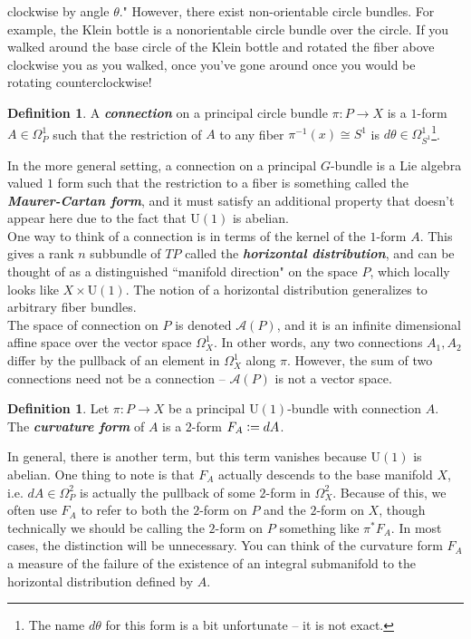 \documentclass[psamsfonts, 12pt]{amsart}
\theoremstyle{definition}
\newtheorem{defn}[thm]{Definition}
\theoremstyle{remark}
\newcommand{\ib}[1]{\textbf{\textit{#1}}}
\newcommand{\inv}{^{-1}}
\newcommand{\defeq}{\vcentcolon=}
\begin{document}
clockwise by angle $\theta$." However, there exist non-orientable circle bundles. For
example, the Klein bottle is a nonorientable circle bundle over the circle. If you
walked around the base circle of the Klein bottle and rotated the fiber above clockwise
you as you walked, once you've gone around once you would be rotating counterclockwise!
%
\begin{defn}
A \ib{connection} on a principal circle bundle $\pi : P \to X$ is a $1$-form
$A \in \Omega^1_P$ such that the restriction of $A$ to any fiber $\pi\inv(x) \cong S^1$
is $d\theta \in \Omega^1_{S^1}$\footnote{The name $d\theta$ for this form is a bit
unfortunate -- it is not exact.}.
\end{defn}
%
In the more general setting, a connection on a principal $G$-bundle is a Lie
algebra valued $1$ form such that the restriction to a fiber is something called
the \ib{Maurer-Cartan form}, and it must satisfy an additional property that doesn't
appear here due to the fact that $\mathrm{U}(1)$ is abelian. \\

One way to think of a connection is in terms of the kernel of the $1$-form $A$.
This gives a rank $n$ subbundle of $TP$ called the \ib{horizontal distribution},
and can be thought of as a distinguished ``manifold direction" on the space $P$,
which locally looks like $X \times \mathrm{U}(1)$. The notion of a horizontal
distribution generalizes to arbitrary fiber bundles. \\

The space of connection on $P$ is denoted $\mathscr{A}(P)$, and it is an
infinite dimensional affine space over the vector space $\Omega^1_X$. In
other words, any two connections $A_1,A_2$ differ by the pullback of an element
in $\Omega^1_X$ along $\pi$. However, the sum of two connections need not
be a connection -- $\mathscr{A}(P)$ is not a vector space.
%
\begin{defn}
Let $\pi : P \to X$ be a principal $\mathrm{U}(1)$-bundle with connection $A$.
The \ib{curvature form} of $A$ is a $2$-form $F_A \defeq dA$.
\end{defn}
%
In general, there is another term, but this term vanishes because $\mathrm{U}(1)$ is
abelian. One thing to note is that $F_A$ actually descends to the base manifold $X$,
i.e. $dA \in \Omega^2_P$ is actually the pullback of some $2$-form in $\Omega^2_X$.
Because of this, we often use $F_A$ to refer to both the $2$-form on $P$ and the
$2$-form on $X$, though technically we should be calling the $2$-form on $P$ something
like $\pi^*F_A$. In most cases, the distinction will be unnecessary. You can think of
the curvature form $F_A$ a measure of the failure of the existence of an integral
submanifold to the horizontal distribution defined by $A$.  \\
\end{document}
